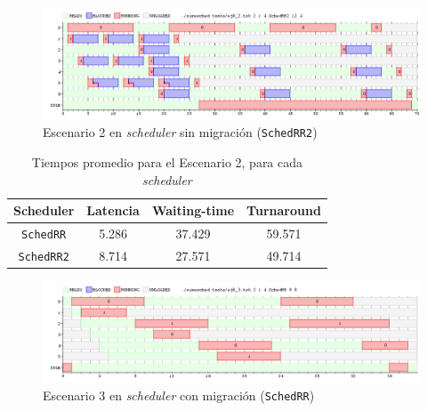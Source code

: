 \begin{figure}[H]
    \begin{center}
        \includegraphics[width=1\columnwidth]{imagenes/ej8_2_rr2.png}
        \caption{Escenario 2 en \emph{scheduler} sin migración (\texttt{SchedRR2})}
    \end{center}
\end{figure}

\begin{table}[H]
    \begin{center}
        \begin{tabular}{|c|c|c|c|}
            \hline
            \textbf{Scheduler} & \textbf{Latencia} & \textbf{Waiting-time} & \textbf{Turnaround} \\ \hline
            \texttt{SchedRR}   & 5.286             & 37.429                & 59.571 \\
            \texttt{SchedRR2}  & 8.714             & 27.571                & 49.714 \\ \hline
        \end{tabular}
        \caption{Tiempos promedio para el Escenario 2, para cada \emph{scheduler}}
    \end{center}
\end{table}


\begin{figure}[H]
    \begin{center}
        \includegraphics[width=1\columnwidth]{imagenes/ej8_3_rr.png}
        \caption{Escenario 3 en \emph{scheduler} con migración (\texttt{SchedRR})}
    \end{center}
\end{figure}

